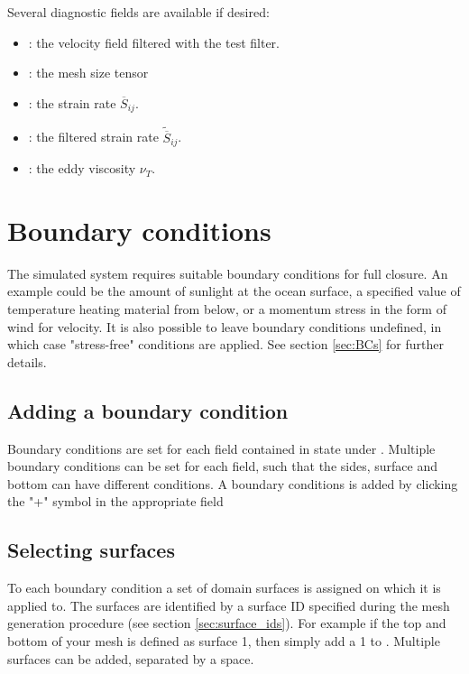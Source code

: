Several diagnostic fields are available if desired:

\begin{itemize}
\item {}: the velocity field filtered with the test filter.
\item {}: the mesh size tensor
\item {}: the strain rate $\overline S_{ij}$.
\item {}: the filtered strain rate $\widetilde{\overline S}_{ij}$.
\item {}: the eddy viscosity $\nu_T$.
\end{itemize}

\section{Boundary conditions}\label{Sec:BCs_configure}


The simulated system requires suitable boundary conditions for full closure.
An example could be the amount of sunlight at the ocean surface, a specified value of
temperature heating material from below, or a momentum stress in the form of wind for velocity.
It is also possible to leave boundary conditions undefined, in which case "stress-free" conditions are
applied. See section \ref{sec:BCs} for further details.

\subsection{Adding a boundary condition}\label{sec:BCs:adding}

Boundary conditions are set for each field contained in state under . 
Multiple boundary conditions can be set for each field, such that the sides, surface and bottom can 
have different conditions. A boundary conditions is added by clicking the "+" symbol
in the appropriate field

\subsection{Selecting surfaces}\label{sec:BCs:selecting}
To each boundary condition a set of domain surfaces is assigned on which it is applied to. The surfaces are identified by a surface ID specified during the mesh generation procedure (see section \ref{sec:surface_ids}). For example if the top and bottom of your mesh is defined as surface
1, then simply add a 1 to . Multiple surfaces 
can be added, separated by a space.

